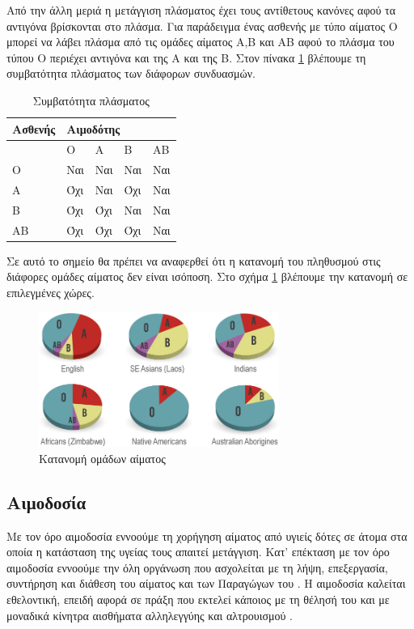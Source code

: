 	Από την άλλη μεριά η μετάγγιση πλάσματος έχει τους αντίθετους κανόνες αφού τα αντιγόνα βρίσκονται στο πλάσμα. Για παράδειγμα ένας ασθενής με τύπο αίματος O μπορεί να λάβει πλάσμα από τις ομάδες αίματος A,B και ΑΒ αφού το πλάσμα του τύπου Ο περιέχει αντιγόνα και της Α και της Β. Στον πίνακα \ref{tab:plasma_compatibility} βλέπουμε τη συμβατότητα πλάσματος των διάφορων συνδυασμών.
\begin{table}[H]
	\centering
	\begin{tabular}{l|llll}
		Ασθενής & \multicolumn{4}{l}{Αιμοδότης} \\ \hline
			& Ο     & Α     & Β     & ΑΒ    \\
		Ο       & Ναι   & Ναι   & Ναι   & Ναι   \\
		Α       & Όχι   & Ναι   & Όχι   & Ναι   \\ 
		Β       & Όχι   & Όχι   & Ναι   & Ναι   \\
		ΑΒ      & Όχι   & Όχι   & Όχι   & Ναι  
	\end{tabular}
	\caption{Συμβατότητα πλάσματος}
	\label{tab:plasma_compatibility}
\end{table}
	Σε αυτό το σημείο θα πρέπει να αναφερθεί ότι η κατανομή του πληθυσμού στις διάφορες ομάδες αίματος δεν είναι ισόποση. Στο σχήμα \ref{fig:blood_distribution} βλέπουμε την κατανομή σε επιλεγμένες χώρες.
\begin{figure}[h!]
	    \centering
	    \includegraphics[width=0.7\textwidth]{blood_distribution.jpg}
	    \caption{Κατανομή ομάδων αίματος}
	    \label{fig:blood_distribution}
\end{figure}	

	\subsection{Αιμοδοσία}
	Με τον όρο αιμοδοσία εννοούμε τη χορήγηση αίματος από υγιείς δότες σε άτομα στα
οποία η κατάσταση της υγείας τους απαιτεί μετάγγιση. Κατ' επέκταση με τον όρο αιμοδοσία εννοούμε την όλη οργάνωση που ασχολείται με τη λήψη, επεξεργασία, συντήρηση και διάθεση του αίματος και των Παραγώγων του \cite{bloodDonationDefinition}. Η αιμοδοσία καλείται εθελοντική, επειδή αφορά σε πράξη που εκτελεί κάποιος με τη θέλησή του και με μοναδικά κίνητρα αισθήματα αλληλεγγύης και αλτρουισμού \cite{1973}. 

